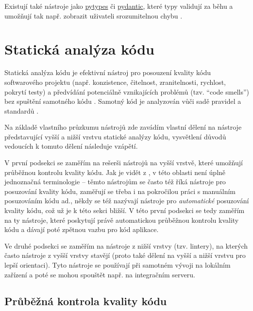 Existují také nástroje jako \href{https://github.com/Stewori/pytypes}{pytypes} či \href{https://github.com/samuelcolvin/pydantic/}{pydantic}, které typy validují za běhu a umožňují tak např. zobrazit uživateli srozumitelnou chybu \cite{types-python-bernat, pydantic}. 


\section{Statická analýza kódu}\label{sec:statickaanalyzakodu}

Statická analýza kódu je efektivní nástroj pro posouzení kvality kódu softwarového projektu (např. konzistence, čitelnost, zranitelnosti, rychlost, pokrytí testy) a předvídání potenciálně vznikajících problémů (tzv. \enquote{code smells}) bez spuštění samotného kódu \cite{medium-devgurus, static-overops}. Samotný kód je analyzován vůči sadě pravidel a standardů \cite{static-overops}.

Na základě vlastního průzkumu nástrojů zde zavádím vlastní dělení na nástroje představující vyšší a nižší vrstvu statické analýzy kódu, vysvětlení důvodů vedoucích k tomuto dělení následuje vzápětí.

V první podsekci se zaměřím na rešerši nástrojů na vyšší vrstvě, které umožňují průběžnou kontrolu kvality kódu. Jak je vidět z \cite{guru-codereview, gh-awesomecodereview, medium-devgurus,stackshare-codereview, gh-awesomecodereview2}, v této oblasti není úplně jednoznačná terminologie -- těmto nástrojům se často též říká nástroje pro posuzování kvality kódu, zaměřují se třeba i na pokročilou práci s manuálním posuzováním kódu ad., někdy se též nazývají nástroje pro \textit{automatické} posuzování kvality kódu, což už je k této sekci bližší. V této první podsekci se tedy zaměřím na ty nástroje, které poskytují právě automatickou průběžnou kontrolu kvality kódu a dávají poté zpětnou vazbu pro kód aplikace.

Ve druhé podsekci se zaměřím na nástroje z nižší vrstvy (tzv. lintery), na kterých často nástroje z vyšší vrstvy stavějí (proto také dělení na vyšší a nižší vrstvu pro lepší orientaci). Tyto nástroje se používají při samotném vývoji na lokálním zařízení a poté se mohou spouštět např. na integračním serveru.

\subsection{Průběžná kontrola kvality kódu}\label{subsec:prubeznakontrolakvalitykodu}

